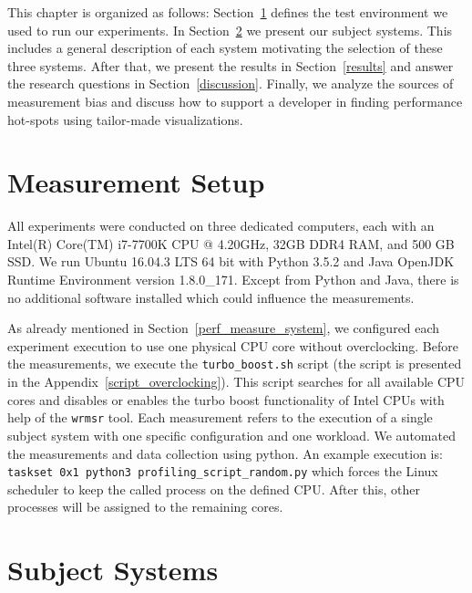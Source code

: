 This chapter is organized as follows: Section~\ref{test_env} defines the test environment we used to run our experiments. In Section~\ref{subject_systems} we present our subject systems. This includes a general description of each system motivating the selection of these three systems. After that, we present the  results in Section~\ref{results} and answer the research questions in Section~\ref{discussion}. Finally, we analyze the sources of measurement bias and discuss how to support a developer in finding performance hot-spots using tailor-made visualizations.


\section{Measurement Setup}
\label{test_env}

All experiments were conducted on three dedicated computers, each with an Intel(R) Core(TM) i7-7700K CPU @ 4.20GHz, 32GB DDR4 RAM, and 500 GB SSD. We run Ubuntu 16.04.3 LTS 64 bit with Python 3.5.2 and Java OpenJDK Runtime Environment version 1.8.0\_171. Except from Python and Java, there is no additional software installed which could influence the measurements. 

As already mentioned in Section~\ref{perf_measure_system}, we configured each experiment execution to use one physical CPU core without overclocking. Before the measurements, we execute the \texttt{turbo\_boost.sh} script (the script is presented in the Appendix~\ref{script_overclocking}). This script searches for all available CPU cores and disables or enables the turbo boost functionality of Intel CPUs with help of the \texttt{wrmsr} tool. Each measurement refers to the execution of a single subject system with one specific configuration and one workload. We automated the measurements and data collection using python. An example execution is: \texttt{taskset 0x1 python3 profiling\_script\_random.py} which forces the Linux scheduler to keep the called process on the defined CPU. After this, other processes will be assigned to the remaining cores.



\section{Subject Systems}
\label{subject_systems}

